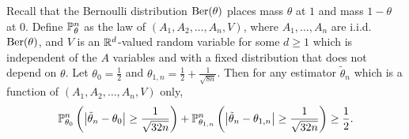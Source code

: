 \begin{lemma}
  \label{lem:kernel_app_neyman_pearson_bernoulli}

  Recall that the Bernoulli distribution
  $\Ber(\theta)$
  places mass $\theta$ at $1$ and mass
  $1-\theta$ at $0$.
  Define $\P_\theta^n$ as the law of
  $(A_1, A_2, \ldots, A_n, V)$,
  where $A_1, \ldots, A_n$
  are i.i.d.\ $\Ber(\theta)$,
  and $V$ is an $\R^d$-valued random variable
  for some $d \geq 1$
  which is independent of the $A$ variables
  and with a fixed distribution that does not depend on $\theta$.
  Let $\theta_0 = \frac{1}{2}$
  and $\theta_{1,n} = \frac{1}{2} + \frac{1}{\sqrt{8n}}$.
  Then for any estimator $\tilde \theta_n$
  which is a function of
  $(A_1, A_2, \ldots, A_n, V)$ only,
  \begin{align*}
    \P_{\theta_0}^n \left(
      \big| \tilde \theta_n - \theta_0 \big|
      \geq \frac{1}{\sqrt{32n}}
    \right)
    + \P_{\theta_{1,n}}^n \left(
      \big| \tilde \theta_n - \theta_{1,n} \big|
      \geq \frac{1}{\sqrt{32n}}
    \right)
    \geq \frac{1}{2}.
  \end{align*}

\end{lemma}

